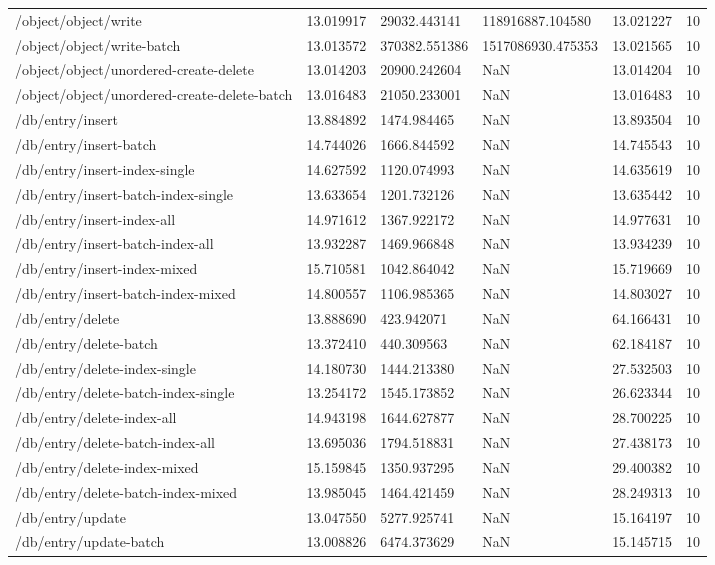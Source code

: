 \begin{tabularx}{\linewidth}{XXXXXX}
/object/object/write & 13.019917 & 29032.443141 & 118916887.104580 & 13.021227 & 10 \\
/object/object/write-batch & 13.013572 & 370382.551386 & 1517086930.475353 & 13.021565 & 10 \\
/object/object/unordered-create-delete & 13.014203 & 20900.242604 & NaN & 13.014204 & 10 \\
/object/object/unordered-create-delete-batch & 13.016483 & 21050.233001 & NaN & 13.016483 & 10 \\
/db/entry/insert & 13.884892 & 1474.984465 & NaN & 13.893504 & 10 \\
/db/entry/insert-batch & 14.744026 & 1666.844592 & NaN & 14.745543 & 10 \\
/db/entry/insert-index-single & 14.627592 & 1120.074993 & NaN & 14.635619 & 10 \\
/db/entry/insert-batch-index-single & 13.633654 & 1201.732126 & NaN & 13.635442 & 10 \\
/db/entry/insert-index-all & 14.971612 & 1367.922172 & NaN & 14.977631 & 10 \\
/db/entry/insert-batch-index-all & 13.932287 & 1469.966848 & NaN & 13.934239 & 10 \\
/db/entry/insert-index-mixed & 15.710581 & 1042.864042 & NaN & 15.719669 & 10 \\
/db/entry/insert-batch-index-mixed & 14.800557 & 1106.985365 & NaN & 14.803027 & 10 \\
/db/entry/delete & 13.888690 & 423.942071 & NaN & 64.166431 & 10 \\
/db/entry/delete-batch & 13.372410 & 440.309563 & NaN & 62.184187 & 10 \\
/db/entry/delete-index-single & 14.180730 & 1444.213380 & NaN & 27.532503 & 10 \\
/db/entry/delete-batch-index-single & 13.254172 & 1545.173852 & NaN & 26.623344 & 10 \\
/db/entry/delete-index-all & 14.943198 & 1644.627877 & NaN & 28.700225 & 10 \\
/db/entry/delete-batch-index-all & 13.695036 & 1794.518831 & NaN & 27.438173 & 10 \\
/db/entry/delete-index-mixed & 15.159845 & 1350.937295 & NaN & 29.400382 & 10 \\
/db/entry/delete-batch-index-mixed & 13.985045 & 1464.421459 & NaN & 28.249313 & 10 \\
/db/entry/update & 13.047550 & 5277.925741 & NaN & 15.164197 & 10 \\
/db/entry/update-batch & 13.008826 & 6474.373629 & NaN & 15.145715 & 10 \\

\end{tabularx}
